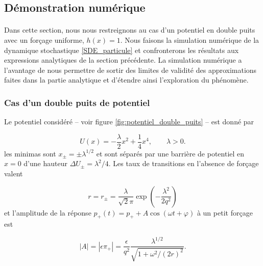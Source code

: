 \subsection{Démonstration numérique}

\paragraph{} Dans cette section, nous nous restreignons au cas d'un potentiel en double puits avec un forçage uniforme, $h(x)=1$.
Nous faisons la simulation numérique de la dynamique stochastique \ref{SDE_particule} et confronterons les résultats aux expressions analytiques de la section précédente. La simulation numérique a l'avantage de nous permettre de sortir des limites de validité des approximations faites dans la partie analytique et d'étendre ainsi l'exploration du phénomène.


\subsubsection{Cas d'un double puits de potentiel}

Le potentiel considéré -- voir figure \ref{fig:potentiel_double_puits} -- est donné par

\begin{equation}\label{potentiel_double_puits}
U(x) = -\frac{\lambda}{2}x^2 + \frac{1}{4} x^4, \qquad \lambda>0.
\end{equation}
les minimas sont $x_\pm = \pm \lambda^{1/2}$ et sont séparés par une barrière de potentiel en $x=0$ d'une hauteur $\Delta U_\pm = \lambda^2/4$. Les taux de transitions en l'absence de forçage valent

\begin{equation}\label{r_dbpuits}
	r = r_\pm = \frac{\lambda}{\sqrt 2\pi} \exp\left( -\frac{\lambda^2}{2 q^2} \right) 
\end{equation}
et l'amplitude de la réponse $p_+(t) = p_+ + A\cos(\omega t+\varphi)$ à un petit forçage est

\begin{equation}\label{pi_dbpuits}
	|A| = |\epsilon \pi_+| = \frac{\epsilon}{q^2} \frac{\lambda^{1/2}}{\sqrt{1+\omega^2/(2r)^2}}.
\end{equation}


